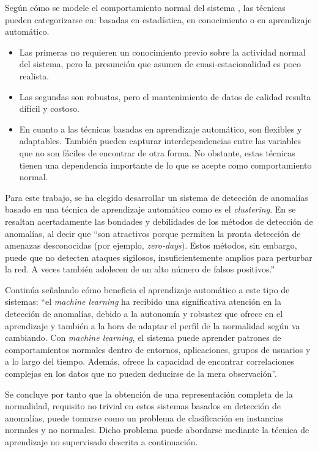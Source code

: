Según cómo se modele el comportamiento normal del sistema \cite{Lazaveric_2005}, las técnicas pueden categorizarse en: basadas en estadística, en conocimiento o en aprendizaje automático.
\begin{itemize}
    \item Las primeras no requieren un conocimiento previo sobre la actividad normal del sistema, pero la presunción que asumen de cuasi-estacionalidad es poco realista.
    \item Las segundas son robustas, pero el mantenimiento de datos de calidad resulta difícil y costoso.
    \item En cuanto a las técnicas basadas en aprendizaje automático, son flexibles y adaptables.
También pueden capturar interdependencias entre las variables que no son fáciles de encontrar de otra forma.
No obstante, estas técnicas tienen una dependencia importante de lo que se acepte como comportamiento normal.
\end{itemize}

Para este trabajo, se ha elegido desarrollar un sistema de detección de anomalías basado en una técnica de aprendizaje automático como es el \emph{clustering}.
En \cite{Alconzo_2019} se resaltan acertadamente las bondades y debilidades de los métodos de detección de anomalías, al decir que
``son atractivos porque permiten la pronta detección de amenazas desconocidas (por ejemplo, \emph{zero-days}).
Estos métodos, sin embargo, puede que no detecten ataques sigilosos, insuficientemente amplios para perturbar la red.
A veces también adolecen de un alto número de falsos positivos.''

Continúa señalando cómo beneficia el aprendizaje automático a este tipo de sistemas: ``el \emph{machine learning} ha recibido una significativa atención en la detección de anomalías, debido a
la autonomía y robustez que ofrece en el aprendizaje y también a la hora de adaptar el perfil de la normalidad según va cambiando.
Con \emph{machine learning}, el sistema puede aprender patrones de comportamientos normales dentro de entornos, aplicaciones, grupos de usuarios y a lo largo del tiempo.
Además, ofrece la capacidad de encontrar correlaciones complejas en los datos que no pueden deducirse de la mera observación''.

Se concluye por tanto que la obtención de una representación completa de la normalidad, requisito no trivial en estos sistemas basados en detección de anomalías,
puede tomarse como un problema de clasificación en instancias normales y no normales.
Dicho problema puede abordarse mediante la técnica de aprendizaje no supervisado descrita a continuación.

